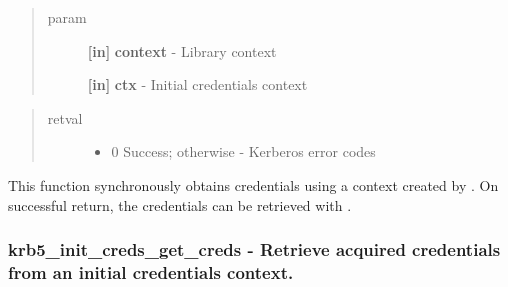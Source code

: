 \documentclass[letterpaper,10pt,english]{sphinxmanual}
\begin{document}
\begin{quote}\begin{description}
\item[{param}] \leavevmode
\textbf{{[}in{]}} \textbf{context} - Library context

\textbf{{[}in{]}} \textbf{ctx} - Initial credentials context

\end{description}\end{quote}
\begin{quote}\begin{description}
\item[{retval}] \leavevmode\begin{itemize}
\item {} 
0   Success; otherwise - Kerberos error codes

\end{itemize}

\end{description}\end{quote}

This function synchronously obtains credentials using a context created by {\hyperref[appdev/refs/api/krb5_init_creds_init:krb5_init_creds_init]{}} . On successful return, the credentials can be retrieved with {\hyperref[appdev/refs/api/krb5_init_creds_get_creds:krb5_init_creds_get_creds]{}} .


\subsubsection{krb5\_init\_creds\_get\_creds -  Retrieve acquired credentials from an initial credentials context.}
\label{appdev/refs/api/krb5_init_creds_get_creds::doc}\label{appdev/refs/api/krb5_init_creds_get_creds:krb5-init-creds-get-creds-retrieve-acquired-credentials-from-an-initial-credentials-context}

\begin{fulllineitems}
\label{appdev/refs/api/krb5_init_creds_get_creds:krb5_init_creds_get_creds}
\end{fulllineitems}
\end{document}

